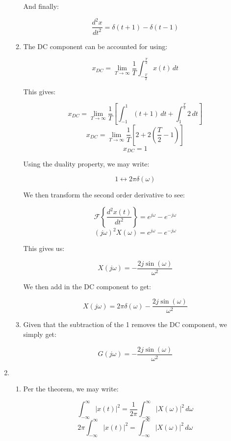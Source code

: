 \begin{enumerate}
\begin{enumerate}
        And finally:

        $$\boxed{\frac{d^2x}{dt^2}=\delta(t+1)-\delta(t-1)}$$

      \item The DC component can be accounted for using:

        $$x_{DC}=\lim_{T\to\infty}\frac{1}{T}\int_{-\frac{T}{2}}^{\frac{T}{2}} x(t)\,dt$$

        This gives:

        $$x_{DC}=\lim_{T\to\infty} \frac{1}{T}\left[ \int_{-1}^{1}(t+1)\,dt+\int_1^{\frac{T}{2}} 2\,dt \right]$$
        $$x_{DC}=\lim_{T\to\infty} \frac{1}{T}\left[ 2+2\left( \frac{T}{2}-1 \right) \right]$$
        $$x_{DC}=1$$

        Using the duality property, we may write:

        $$1\leftrightarrow 2\pi\delta(\omega)$$

        We then transform the second order derivative to see:

        $$\mathcal{F}\left\{ \frac{d^2x(t)}{dt^2} \right\}=e^{j\omega} -e^{-j\omega}$$
        $$(j\omega)^2X(\omega)=e^{j\omega} -e^{-j\omega}$$

        This gives us:

        $$X(j\omega)=-\frac{2j\sin(\omega)}{\omega^2}$$
          
        We then add in the DC component to get:

        $$\boxed{X(j\omega)=2\pi\delta(\omega)-\frac{2j\sin(\omega)}{\omega^2}}$$

      \item Given that the subtraction of the 1 removes the DC component, we simply get:

        $$\boxed{G(j\omega)=-\frac{2j\sin(\omega)}{\omega^2}}$$

    \end{enumerate}

    \setcounter{enumi}{3}

  \item

    \begin{enumerate}

      \item Per the theorem, we may write:

        $$\int_{-\infty}^{\infty}|x(t)|^2=\frac{1}{2\pi}\int_{-\infty}^{\infty} |X(\omega)|^2\,d\omega$$
        $$2\pi\int_{-\infty}^{\infty}|x(t)|^2=\int_{-\infty}^{\infty} |X(\omega)|^2\,d\omega$$


\end{enumerate}
\end{enumerate}
